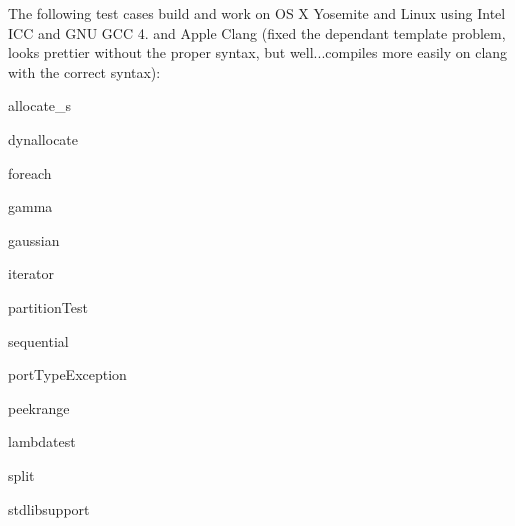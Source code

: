 The following test cases build and work on OS X Yosemite and Linux using Intel I\+CC and G\+NU G\+CC 4. and Apple Clang (fixed the dependant template problem, looks prettier without the proper syntax, but well...compiles more easily on clang with the correct syntax)\+:


\begin{DoxyItemize}
\item allocate\+\_\+s
\item dynallocate
\item foreach
\item gamma
\item gaussian
\item iterator
\item partition\+Test
\item sequential
\item port\+Type\+Exception
\item peekrange
\item lambdatest
\item split
\item stdlibsupport 
\end{DoxyItemize}